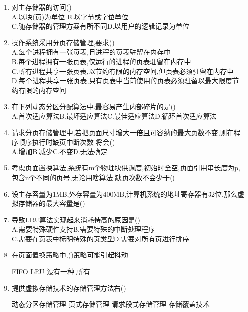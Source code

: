 \documentclass[12pt, a4paper, oneside, UTF8]{ctexbook}
\begin{document}
\begin{enumerate}
    \item 对主存储器的访问() \\
    A.以块(页)为单位 \qquad B.以字节或字位单位 \\
    C.随存储器的管理方案有所不同\qquad D.以用户的逻辑记录为单位

    \item 操作系统采用分页存储管理,要求() \\
    A.每个进程拥有一张页表,且进程的页表驻留在内存中 \\
    B.每个进程拥有一张页表,仅运行的进程的页表驻留在内存中\\
    C.所有进程共享一张页表,以节约有限的内存空间,但页表必须驻留在内存中 \\
    D.每个进程共享一张页表,只有页表中当前使用的页表必须驻留以最大限度节约有限的内存空间

    \item 在下列动态分区分配算法中,最容易产生内部碎片的是()  \\
    A.首次适应算法\qquad B.最坏适应算法\qquad C.最佳适应算法\qquad D.循环首次适应算法

    \item 请求分页存储管理中,若把页面尺寸增大一倍且可容纳的最大页数不变,则在程序顺序执行时缺页中断次数
    将会() \\
    A.增加\qquad B.减少\qquad C.不变\qquad D.无法确定

    \item 考虑页面置换算法,系统有m个物理块供调度,初始时全空,页面引用串长度为p,包含n个不同的页号,无论用啥算法
    缺页次数不会少于()

    \item 设主存容量为1MB,外存容量为400MB,计算机系统的地址寄存器有32位,那么虚拟存储器的最大容量是() 

    \item 导致LRU算法实现起来消耗特高的原因是() \\
    A.需要特殊硬件支持\qquad B.需要特殊的中断处理程序 \\
    C.需要在页表中标明特殊的页类型\qquad D.需要对所有页进行排序

    \item 在页面置换策略中,()策略可能引起抖动. 
    \begin{choices}
        \task FIFO
        \task LRU
        \task 没有一种 
        \task 所有 
    \end{choices}

    \item 提供虚拟存储技术的存储管理方法右() 
    \begin{choices}[2]
        \task 动态分区存储管理
        \task 页式存储管理
        \task 请求段式存储管理
        \task 存储覆盖技术
    \end{choices}


\end{enumerate}
\end{document}
